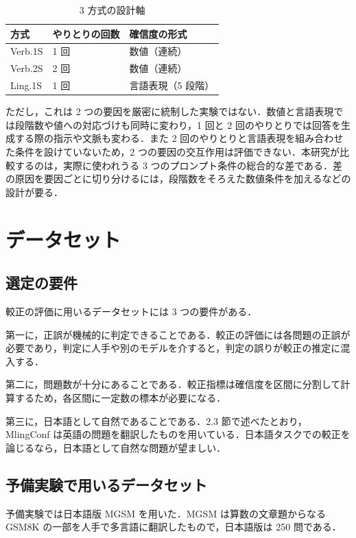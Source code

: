 \begin{table}[htbp]
\centering
\small
\caption{3 方式の設計軸}
\label{tab:3.2}
\begin{tabular}{|l|l|l|}
\hline
方式 & やりとりの回数 & 確信度の形式 \\
\hline
Verb.1S & 1 回 & 数値（連続） \\
Verb.2S & 2 回 & 数値（連続） \\
Ling.1S & 1 回 & 言語表現（5 段階） \\
\hline
\end{tabular}
\end{table}

ただし，これは 2 つの要因を厳密に統制した実験ではない．数値と言語表現では段階数や値への対応づけも同時に変わり，1 回と 2 回のやりとりでは回答を生成する際の指示や文脈も変わる．また 2 回のやりとりと言語表現を組み合わせた条件を設けていないため，2 つの要因の交互作用は評価できない．本研究が比較するのは，実際に使われうる 3 つのプロンプト条件の総合的な差である．差の原因を要因ごとに切り分けるには，段階数をそろえた数値条件を加えるなどの設計が要る．

\section{データセット}

\subsection{選定の要件}

較正の評価に用いるデータセットには 3 つの要件がある．

第一に，正誤が機械的に判定できることである．較正の評価には各問題の正誤が必要であり，判定に人手や別のモデルを介すると，判定の誤りが較正の推定に混入する．

第二に，問題数が十分にあることである．較正指標は確信度を区間に分割して計算するため，各区間に一定数の標本が必要になる．

第三に，日本語として自然であることである．2.3 節で述べたとおり，MlingConf は英語の問題を翻訳したものを用いている．日本語タスクでの較正を論じるなら，日本語として自然な問題が望ましい．

\subsection{予備実験で用いるデータセット}

予備実験では日本語版 MGSM \cite{shi2023mgsm} を用いた．MGSM は算数の文章題からなるGSM8K \cite{cobbe2021gsm8k} の一部を人手で多言語に翻訳したもので，日本語版は 250 問である．

